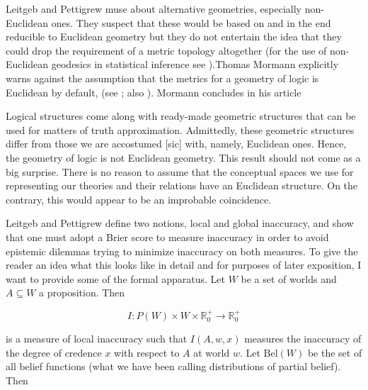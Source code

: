 \documentclass[11pt]{article}
\begin{document}
Leitgeb and Pettigrew muse about alternative geometries, especially
non-Euclidean ones. They suspect that these would be based on and in
the end reducible to Euclidean geometry but they do not entertain the
idea that they could drop the requirement of a metric topology
altogether (for the use of non-Euclidean geodesics in statistical
inference see ).Thomas Mormann explicitly warns
against the assumption that the metrics for a geometry of logic is
Euclidean by default,  (see ; also
). Mormann concludes in his article

\begin{quotex}
  Logical structures come along with ready-made geometric structures
  that can be used for matters of truth approximation. Admittedly,
  these geometric structures differ from those we are accostumed [sic]
  with, namely, Euclidean ones. Hence, the geometry of logic is not
  Euclidean geometry. This result should not come as a big surprise.
  There is no reason to assume that the conceptual spaces we use for
  representing our theories and their relations have an Euclidean
  structure. On the contrary, this would appear to be an improbable
  coincidence. 
\end{quotex}

Leitgeb and Pettigrew define two notions, local and global inaccuracy,
and show that one must adopt a Brier score to measure inaccuracy in
order to avoid epistemic dilemmas trying to minimize inaccuracy on
both measures. To give the reader an idea what this looks like in
detail and for purposes of later exposition, I want to provide some of
the formal apparatus. Let $W$ be a set of worlds and $A\subseteq{}W$ a
proposition. Then

\begin{equation}
  \label{eq:linacc}
  I:P(W)\times{}W\times{}\mathbb{R}^{+}_{0}\rightarrow\mathbb{R}^{+}_{0}
\end{equation}

{\noindent}is a measure of local inaccuracy such that $I(A,w,x)$
measures the inaccuracy of the degree of credence $x$ with respect to
$A$ at world $w$. Let $\mbox{Bel}(W)$ be the set of all belief
functions (what we have been calling distributions of partial belief).
Then
\end{document}
